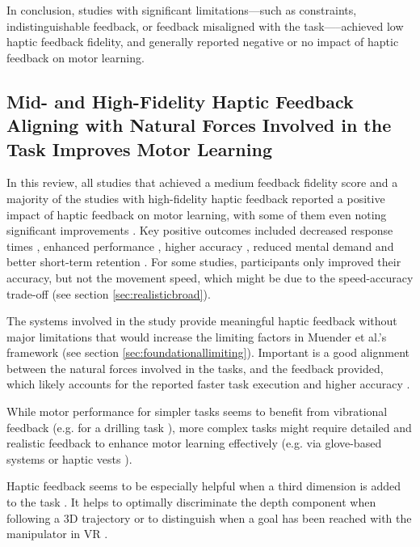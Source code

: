 In conclusion, studies with significant limitations---such as constraints, indistinguishable feedback, or feedback misaligned with the task—--achieved low haptic feedback fidelity, and generally reported negative or no impact of haptic feedback on motor learning.


\subsection{Mid- and High-Fidelity Haptic Feedback Aligning with Natural Forces Involved in the Task Improves Motor Learning}

In this review, all studies that achieved a medium feedback fidelity score and a majority of the studies with high-fidelity haptic feedback reported a positive impact of haptic feedback on motor learning, with some of them even noting significant improvements \cite{Yang2023, LiuH2019, Dai2023, Grant2019, Fehlberg2012, Huang2006}. 
Key positive outcomes included decreased response times \cite{Najdovski2020}, enhanced performance \cite{Chappell2022, Fehlberg2012, LiuG2014, Mohanty2023}, higher accuracy \cite{Perez2023}, reduced mental demand \cite{Yang2023, Manivannan2008, Trinitatova2023} and better short-term retention \cite{LeeH2014}.
For some studies, participants only improved their accuracy, but not the movement speed, which might be due to the speed-accuracy trade-off \cite{LiuG2014, Caccianiga2021} (see section \ref{sec:realisticbroad}).

The systems involved in the study provide meaningful haptic feedback without major limitations that would increase the limiting factors in Muender et al.'s framework (see section \ref{sec:foundationallimiting}). Important is a good alignment between the natural forces involved in the tasks, and the feedback provided, which likely accounts for the reported faster task execution and higher accuracy \cite{Najdovski2020, Yang2023}. 

While motor performance for simpler tasks seems to benefit from vibrational feedback (e.g. for a drilling task \cite{Yang2023, Grant2019}), more complex tasks might require detailed and realistic feedback to enhance motor learning effectively (e.g. via glove-based systems \cite{Trinitatova2023} or haptic vests \cite{Xia2023}).

Haptic feedback seems to be especially helpful when a third dimension is added to the task \cite{Feygin2002HapticSkill, Rodriguez2010, Gunter2022, Brickler2019}. It helps to optimally discriminate the depth component when following a 3D trajectory or to distinguish when a goal has been reached with the manipulator in VR \cite{Wall2000}.

